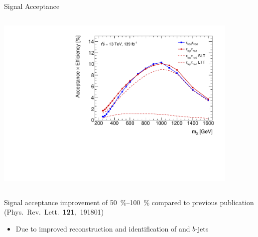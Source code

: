 \documentclass[11pt, xcolor={dvipsnames}, aspectratio=169, notes]{beamer}
\begin{document}
\begin{frame}{Signal Acceptance}

  \vspace*{-1em}

  \begin{columns}[onlytextwidth, t]
    \centering


    \vspace{1.5em}


    \centering


    \includegraphics[width=0.88\textwidth, trim=0 0.5em 0 1em,
    clip]{selection/acceptance_resonant}
  \end{columns}

  \alert{Signal acceptance improvement of \SIrange{50}{100}{\percent}} compared
  to previous publication {\scriptsize (Phys.~Rev.~Lett.~\textbf{121},~191801)}
  \begin{itemize}

  \item Due to improved reconstruction and identification of \tauhadvis and
    $b$-jets

  \end{itemize}
\end{frame}
\end{document}
